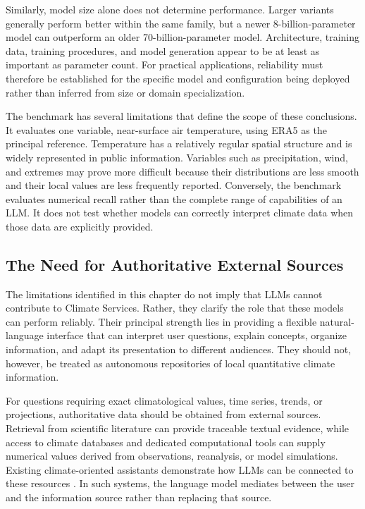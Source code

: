 Similarly, model size alone does not determine performance. Larger variants generally perform better within the same family, but a newer 8-billion-parameter model can outperform an older 70-billion-parameter model. Architecture, training data, training procedures, and model generation appear to be at least as important as parameter count. For practical applications, reliability must therefore be established for the specific model and configuration being deployed rather than inferred from size or domain specialization.

The benchmark has several limitations that define the scope of these conclusions. It evaluates one variable, near-surface air temperature, using ERA5 as the principal reference. Temperature has a relatively regular spatial structure and is widely represented in public information. Variables such as precipitation, wind, and extremes may prove more difficult because their distributions are less smooth and their local values are less frequently reported. Conversely, the benchmark evaluates numerical recall rather than the complete range of capabilities of an LLM. It does not test whether models can correctly interpret climate data when those data are explicitly provided.

\subsection{The Need for Authoritative External Sources}

The limitations identified in this chapter do not imply that LLMs cannot contribute to Climate Services. Rather, they clarify the role that these models can perform reliably. Their principal strength lies in providing a flexible natural-language interface that can interpret user questions, explain concepts, organize information, and adapt its presentation to different audiences. They should not, however, be treated as autonomous repositories of local quantitative climate information.

For questions requiring exact climatological values, time series, trends, or projections, authoritative data should be obtained from external sources. Retrieval from scientific literature can provide traceable textual evidence, while access to climate databases and dedicated computational tools can supply numerical values derived from observations, reanalysis, or model simulations. Existing climate-oriented assistants demonstrate how LLMs can be connected to these resources \citep{vaghefi_chatclimate_2023,koldunov_local_2024}. In such systems, the language model mediates between the user and the information source rather than replacing that source.


